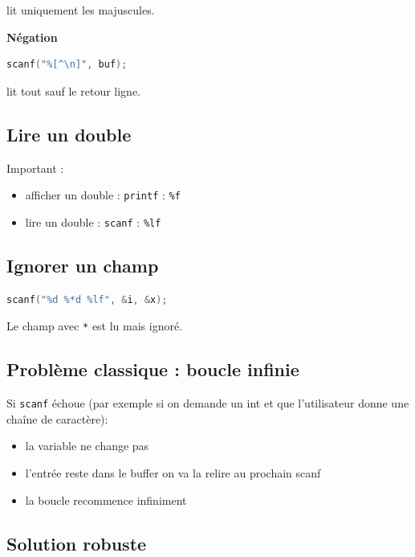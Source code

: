 lit uniquement les majuscules.

\textbf{Négation}

\begin{lstlisting}[language=C]
scanf("%[^\n]", buf);
\end{lstlisting}

lit tout sauf le retour ligne.

\subsection{Lire un double}

Important :

\begin{itemize}
    \item afficher un double : \texttt{printf} : \texttt{\%f}
    \item lire un double : \texttt{scanf} : \texttt{\%lf}
\end{itemize}

\subsection{Ignorer un champ}

\begin{lstlisting}[language=C]
scanf("%d %*d %lf", &i, &x);
\end{lstlisting}

Le champ avec \texttt{*} est lu mais ignoré.

\subsection{Problème classique : boucle infinie}

Si \texttt{scanf} échoue (par exemple si on demande un int et que l'utilisateur donne une chaîne de caractère):

\begin{itemize}
    \item la variable ne change pas
    \item l’entrée reste dans le buffer \textrightarrow on va la relire au prochain scanf
    \item la boucle recommence infiniment 
\end{itemize}

\subsection{Solution robuste}

